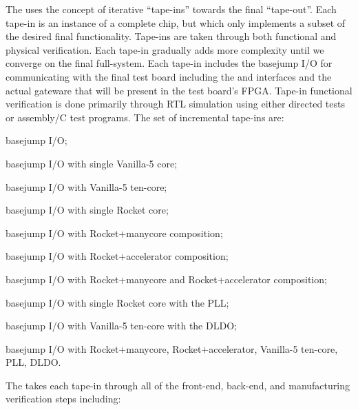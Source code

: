 \begin{cbxlist}{1.5em}{1em}{1em}
 \item The  uses the
    concept of iterative ``tape-ins'' towards the final ``tape-out''.
    Each tape-in is an instance of a complete chip, but which only
    implements a subset of the desired final functionality. Tape-ins are
    taken through both functional and physical verification. Each tape-in
    gradually adds more complexity until we converge on the final
    full-system. Each tape-in includes the basejump I/O for communicating
    with the final test board including the  and
     interfaces and the actual gateware that will be present
    in the test board's FPGA. Tape-in functional verification is done
    primarily through RTL simulation using either directed tests or
    assembly/C test programs. The set of incremental tape-ins are:

    \smallskip
    \begin{cbxlist}[--]{1.5em}{0em}{0em}
      \raggedright

      \item basejump I/O;
      \item basejump I/O with single Vanilla-5 core;
      \item basejump I/O with Vanilla-5 ten-core;
      \item basejump I/O with single Rocket core;
      \item basejump I/O with Rocket+manycore composition;
      \item basejump I/O with Rocket+accelerator composition;
      \item basejump I/O with Rocket+manycore and Rocket+accelerator composition;
      \item basejump I/O with single Rocket core with the PLL;
      \item basejump I/O with Vanilla-5 ten-core with the DLDO;
      \item basejump I/O with Rocket+manycore, Rocket+accelerator,
         Vanilla-5 ten-core, PLL, DLDO.

    \end{cbxlist}

 \item The  takes each
    tape-in through all of the front-end, back-end, and manufacturing
    verification steps including:

    \smallskip
    \begin{cbxlist}[--]{1.5em}{0em}{0em}
      \raggedright


\end{cbxlist}
\end{cbxlist}
